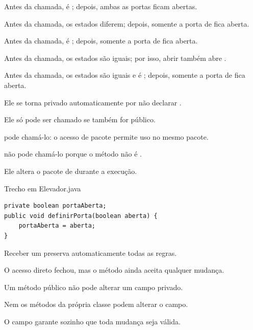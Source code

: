 \documentclass[11pt,a4paper]{article}
\begin{document}
\begin{minipage}[t]{.485\textwidth}
\begin{alternativas}
\item Antes da chamada,  é ; depois, ambas as portas ficam abertas.
\item Antes da chamada, os estados diferem; depois, somente a porta de  fica aberta.
\item Antes da chamada,  é ; depois, somente a porta de  fica aberta.
\item Antes da chamada, os estados são iguais; por isso, abrir  também abre .
\item Antes da chamada, os estados são iguais e  é ; depois, somente a porta de  fica aberta.
\end{alternativas}
\begin{alternativas}
\item Ele se torna privado automaticamente por não declarar .
\item Ele só pode ser chamado se  também for público.
\item {} pode chamá-lo: o acesso de pacote permite uso no mesmo pacote.
\item {} não pode chamá-lo porque o método não é .
\item Ele altera o pacote de  durante a execução.
\end{alternativas}
\begin{painelEvolucao}{Trecho em Elevador.java}
\begin{lstlisting}[style=cenariocodigo]
private boolean portaAberta;
public void definirPorta(boolean aberta) {
    portaAberta = aberta;
}
\end{lstlisting}
\end{painelEvolucao}
\begin{alternativas}
\item Receber um  preserva automaticamente todas as regras.
\item O acesso direto fechou, mas o método ainda aceita qualquer mudança.
\item Um método público não pode alterar um campo privado.
\item Nem os métodos da própria classe podem alterar o campo.
\item O campo  garante sozinho que toda mudança seja válida.
\end{alternativas}
\end{minipage}
\end{document}
